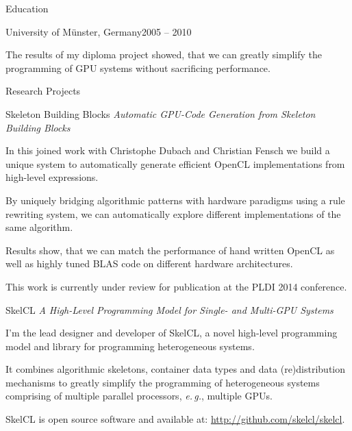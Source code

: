 \documentclass[letterpaper]{resume} %
\begin{document}
\begin{rSection}{Education}
\begin{rSubsection}{University of M\"unster\normalfont{}, Germany}{2005 -- 2010}
\begin{itemize}
        The results of my diploma project showed,
        that we can greatly simplify the programming of GPU systems without
        sacrificing performance.
    \end{itemize}
\end{rSubsection}

\end{rSection}

\begin{rSection}{Research Projects}

\begin{rSubsection}{Skeleton Building Blocks}
                   {\hspace{-5em}\emph{Automatic GPU-Code Generation from Skeleton Building Blocks}\hfill}{}{}
  \item In this joined work with Christophe Dubach and Christian Fensch we
    build a unique system to automatically generate efficient OpenCL
    implementations from high-level expressions.
    
    By uniquely bridging algorithmic patterns with hardware paradigms using
    a rule rewriting system, we can automatically explore different
    implementations of the same algorithm.

    Results show, that we can match the performance of hand written OpenCL
    as well as highly tuned BLAS code on different hardware architectures.

    This work is currently under review for publication at the PLDI 2014
    conference.
\end{rSubsection}

\begin{rSubsection}{SkelCL}%
                   {\hspace{-10em}\emph{A High-Level Programming Model for Single- and Multi-GPU Systems}\hfill}%
                   {}{}
  \item I'm the lead designer and developer of SkelCL, a novel high-level
    programming model and library for programming heterogeneous systems.


    It combines algorithmic skeletons, container data types and data
    (re)distribution mechanisms to greatly simplify the programming of
    heterogeneous systems comprising of multiple parallel processors, \emph{e.\,g.}, multiple GPUs.


    SkelCL is open source software and available at: \url{http://github.com/skelcl/skelcl}.
\end{rSubsection}


\end{rSection}
\end{document}
